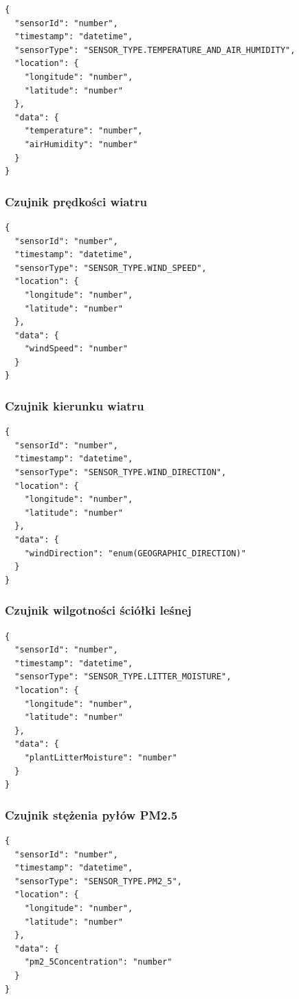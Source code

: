 \documentclass[11pt,a4paper]{article}
\begin{document}
\begin{verbatim}
{
  "sensorId": "number",
  "timestamp": "datetime",
  "sensorType": "SENSOR_TYPE.TEMPERATURE_AND_AIR_HUMIDITY",
  "location": {
    "longitude": "number",
    "latitude": "number"
  },
  "data": {
    "temperature": "number",
    "airHumidity": "number"
  }
}
\end{verbatim}

\subsubsection*{Czujnik prędkości wiatru}

\begin{verbatim}
{
  "sensorId": "number",
  "timestamp": "datetime",
  "sensorType": "SENSOR_TYPE.WIND_SPEED",
  "location": {
    "longitude": "number",
    "latitude": "number"
  },
  "data": {
    "windSpeed": "number"
  }
}
\end{verbatim}

\subsubsection*{Czujnik kierunku wiatru}

\begin{verbatim}
{
  "sensorId": "number",
  "timestamp": "datetime",
  "sensorType": "SENSOR_TYPE.WIND_DIRECTION",
  "location": {
    "longitude": "number",
    "latitude": "number"
  },
  "data": {
    "windDirection": "enum(GEOGRAPHIC_DIRECTION)"
  }
}
\end{verbatim}

\subsubsection*{Czujnik wilgotności ściółki leśnej}

\begin{verbatim}
{
  "sensorId": "number",
  "timestamp": "datetime",
  "sensorType": "SENSOR_TYPE.LITTER_MOISTURE",
  "location": {
    "longitude": "number",
    "latitude": "number"
  },
  "data": {
    "plantLitterMoisture": "number"
  }
}
\end{verbatim}

\subsubsection*{Czujnik stężenia pyłów PM2.5}

\begin{verbatim}
{
  "sensorId": "number",
  "timestamp": "datetime",
  "sensorType": "SENSOR_TYPE.PM2_5",
  "location": {
    "longitude": "number",
    "latitude": "number"
  },
  "data": {
    "pm2_5Concentration": "number"
  }
}
\end{verbatim}
\end{document}
